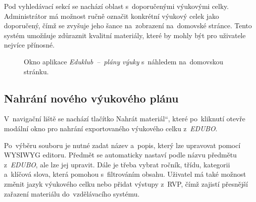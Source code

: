 \documentclass[male,czech,api_bc]{kitheses}
\begin{document}
Pod vyhledávací sekcí se nachází oblast s~doporučenými výukovými celky. Administrátor má možnost ručně označit konkrétní výukový celek jako doporučený, čímž se zvyšuje jeho šance na~zobrazení na~domovské stránce. Tento systém umožňuje zdůraznit kvalitní materiály, které by mohly být pro uživatele nejvíce přínosné.

\begin{figure}[H]
	\centering
	\caption{Okno aplikace \textit{Eduklub~--~plány výuky} s~náhledem na~domovskou stránku.}
	\label{fig:eduklub-1}
\end{figure}

\subsection{Nahrání nového výukového plánu}

V~navigační liště se nachází tlačítko \quotedblbase Nahrát materiál``, které po~kliknutí otevře modální okno pro nahrání exportovaného výukového celku z~\textit{EDUBO}.

Po~výběru souboru je nutné zadat název a~popis, který lze upravovat pomocí WYSIWYG editoru. Předmět se automaticky nastaví podle názvu předmětu z~\textit{EDUBO}, ale lze jej upravit. Dále je třeba vybrat ročník, třídu, kategorii a~klíčová slova, která pomohou s~filtrováním obsahu. Uživatel má také možnost změnit jazyk výukového celku nebo přidat výstupy z~RVP, čímž zajistí přesnější zařazení materiálu do~vzdělávacího systému.
\end{document}
